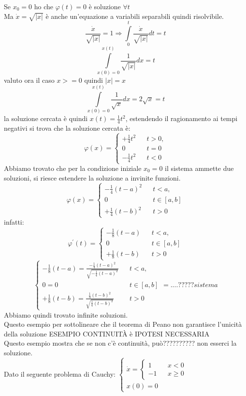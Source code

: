 Se $x_0 = 0$ ho che $\varphi(t)=0$ è soluzione $\forall t$\\
Ma $\dot{x} = \sqrt{|x|}$ è anche un'equazione a variabili separabili quindi risolvibile.\\
$$\frac{\dot{x}}{\sqrt{|x|}}=1 \Rightarrow \int\limits_{0}^{t}{\frac{\dot{x}}{\sqrt{|x|}}dt} = t$$
$$\int\limits_{x(0)=0}^{x(t)}{\frac{1}{\sqrt{|x|}}dx} = t$$
valuto ora il caso $x>=0$ quindi $|x|=x$
$$ \int\limits_{x(0)=0}^{x(t)}{\frac{1}{\sqrt{x}}dx} = 2\sqrt{x} = t$$ 
la soluzione cercata è quindi $x(t)=\frac{1}{4}t^2$, 
estendendo il ragionamento ai tempi negativi si trova che la soluzione cercata è: $$\varphi(x)= \left\{\begin{matrix}+\frac{1}{4}t^2&&t>0,\\0&&t=0\\-\frac{1}{4}t^2&&t<0\end{matrix}\right.$$ 
Abbiamo trovato che per la condizione iniziale $x_0=0$ il sistema ammette due soluzioni, si riesce estendere la soluzione a invinite funzioni.
$$\varphi(x)= \left\{\begin{matrix}-\frac{1}{4}(t-a)^2&&t<a,\\0&&t\in[a,b]\\+\frac{1}{4}(t-b)^2&&t>0\end{matrix}\right.$$
infatti:
$$\varphi^{'}(t) = \left\{\begin{matrix}-\frac{1}{8}(t-a)&&t<a,\\0&&t\in[a,b]\\+\frac{1}{8}(t-b)&&t>0\end{matrix}\right.$$ $$\left\{\begin{matrix}-\frac{1}{8}(t-a)=\frac{-\frac{1}{4}(t-a)^2}{	\sqrt{-\frac{1}{4}(t-a)^2}}&&t<a,\\0=0&&t\in[a,b]\\+\frac{1}{8}(t-b)=\frac{\frac{1}{4}(t-b)^2}{\sqrt{\frac{1}{4}(t-b)^2}}&&t>0\end{matrix}\right. = ....????? sistema $$
Abbiamo quindi trovato infinite soluzioni.\\
Questo esempio per sottolineare che il teorema di Peano non garantisce l'unicità della soluzione
ESEMPIO CONTINUITÀ è IPOTESI NECESSARIA\\
Questo esempio mostra che se non c'è continuità, può?????????? non esserci la soluzione.\\
Dato il seguente problema di Cauchy: $\left\{\begin{matrix}
\dot{x} = \left\{\begin{matrix}1&&x<0\\-1&&x\ge 0\end{matrix}\right.\\
x(0)=0
\end{matrix}\right.$\\

